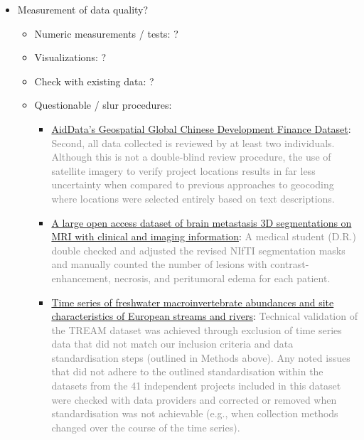 \documentclass[fleqn,10pt]{wlscirep}
\begin{document}
\begin{itemize}
  \item
  Measurement of data quality?
  
  \begin{itemize}
    \item
    Numeric measurements / tests: ?
    
    \item
    Visualizations: ?
    
    \item
    Check with existing data: ?
    
    \item
    Questionable / slur procedures:
      
      \begin{itemize}
      \item
      \href{https://www.nature.com/articles/s41597-024-03341-w?_gl=1*5ya8g2*_up*MQ..&gclid=EAIaIQobChMInOXO84DVhgMViewWBR3vWQJAEAAYASAAEgJICfD_BwE#Sec28}{AidData’s Geospatial Global Chinese Development Finance Dataset}: \textcolor{gray}{Second, all data collected is reviewed by at least two individuals. Although this is not a double-blind review procedure, the use of satellite imagery to verify project locations results in far less uncertainty when compared to previous approaches to geocoding where locations were selected entirely based on text descriptions.}
      
      \item
      \href{https://www.nature.com/articles/s41597-024-03021-9?_gl=1*1u1zppx*_up*MQ..&gclid=EAIaIQobChMInOXO84DVhgMViewWBR3vWQJAEAAYASAAEgJICfD_BwE#Sec9}{A large open access dataset of brain metastasis 3D segmentations on MRI with clinical and imaging information}: \textcolor{gray}{A medical student (D.R.) double checked and adjusted the revised NIfTI segmentation masks and manually counted the number of lesions with contrast-enhancement, necrosis, and peritumoral edema for each patient.}
      
      \item
      \href{https://www.nature.com/articles/s41597-024-03445-3?_gl=1*1ikco52*_up*MQ..&gclid=EAIaIQobChMInOXO84DVhgMViewWBR3vWQJAEAAYASAAEgJICfD_BwE#Sec11}{Time series of freshwater macroinvertebrate abundances and site characteristics of European streams and rivers}: \textcolor{gray}{Technical validation of the TREAM dataset was achieved through exclusion of time series data that did not match our inclusion criteria and data standardisation steps (outlined in Methods above). Any noted issues that did not adhere to the outlined standardisation within the datasets from the 41 independent projects included in this dataset were checked with data providers and corrected or removed when standardisation was not achievable (e.g., when collection methods changed over the course of the time series).}
      

\end{itemize}
\end{itemize}
\end{itemize}
\end{document}
